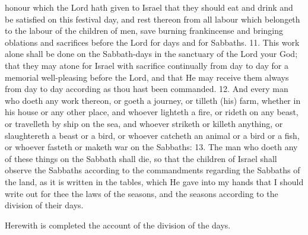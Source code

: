 honour which the Lord hath given to Israel that they should eat and drink and be satisfied on this festival day, and rest thereon from all labour  which belongeth to the labour of the children of men, save burning frankincense and bringing oblations and sacrifices before the Lord for days and for Sabbaths. 11. This work alone shall be done on the Sabbath-days  in the sanctuary of the Lord your God; that they may atone for Israel with sacrifice continually from day to day for a memorial well-pleasing before the Lord, and that He may receive them always from day to day according as thou hast been commanded. 12. And every man who doeth any work thereon, or goeth a journey, or tilleth (his) farm,  whether in his house or any other place,  and whoever lighteth a fire,  or rideth on any beast,  or travelleth by ship on the sea, and whoever striketh or killeth anything, or slaughtereth  a beast or a bird, or whoever catcheth an animal or a bird or a fish, or whoever fasteth or maketh war on the Sabbaths:  13. The man who doeth any of these things on the Sabbath shall die, so that the children of Israel shall observe the Sabbaths according to the commandments regarding the Sabbaths of the land, as it is written in the tables, which He gave into my hands that I should write out for thee the laws of the seasons, and the seasons according to the division of their days.

Herewith is completed the account of the division of the days.
